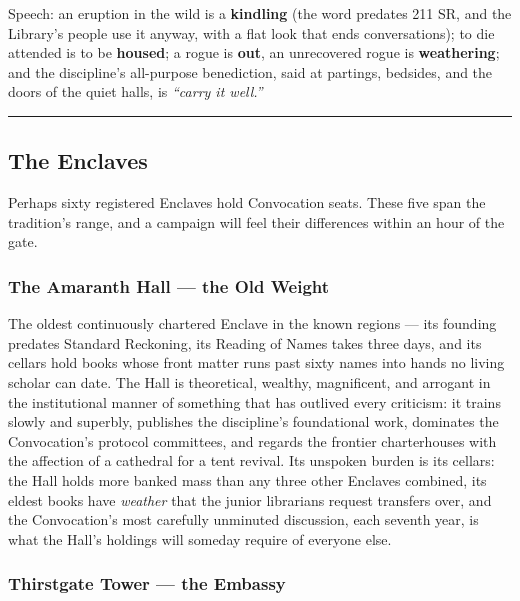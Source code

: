 Speech: an eruption in the wild is a \textbf{kindling} (the word predates 211 SR, and the Library's people use it anyway, with a flat look that ends conversations); to die attended is to be \textbf{housed}; a rogue is \textbf{out}, an unrecovered rogue is \textbf{weathering}; and the discipline's all-purpose benediction, said at partings, bedsides, and the doors of the quiet halls, is \textit{``carry it well.''}

\medskip\hrule\medskip

\subsection{The Enclaves}

Perhaps sixty registered Enclaves hold Convocation seats. These five span the tradition's range, and a campaign will feel their differences within an hour of the gate.

\subsubsection{The Amaranth Hall --- the Old Weight}

The oldest continuously chartered Enclave in the known regions --- its founding predates Standard Reckoning, its Reading of Names takes three days, and its cellars hold books whose front matter runs past sixty names into hands no living scholar can date. The Hall is theoretical, wealthy, magnificent, and arrogant in the institutional manner of something that has outlived every criticism: it trains slowly and superbly, publishes the discipline's foundational work, dominates the Convocation's protocol committees, and regards the frontier charterhouses with the affection of a cathedral for a tent revival. Its unspoken burden is its cellars: the Hall holds more banked mass than any three other Enclaves combined, its eldest books have \textit{weather} that the junior librarians request transfers over, and the Convocation's most carefully unminuted discussion, each seventh year, is what the Hall's holdings will someday require of everyone else.

\subsubsection{Thirstgate Tower --- the Embassy}

